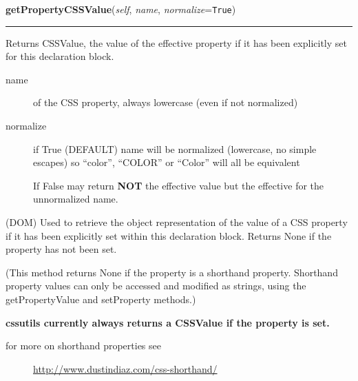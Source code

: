 \hspace{.8\funcindent}\begin{boxedminipage}{\funcwidth}

    \raggedright \textbf{getPropertyCSSValue}(\textit{self}, \textit{name}, \textit{normalize}={\tt True})

    \vspace{-1.5ex}

    \rule{\textwidth}{0.5\fboxrule}
\setlength{\parskip}{2ex}

Returns CSSValue, the value of the effective property if it has been
explicitly set for this declaration block.
\begin{description}
\item[{name}] \leavevmode 
of the CSS property, always lowercase (even if not normalized)

\item[{normalize}] \leavevmode 
if True (DEFAULT) name will be normalized (lowercase, no simple
escapes) so ``color'', ``COLOR'' or ``Color'' will all be equivalent

If False may return \textbf{NOT} the effective value but the effective
for the unnormalized name.

\end{description}

(DOM)
Used to retrieve the object representation of the value of a CSS
property if it has been explicitly set within this declaration
block. Returns None if the property has not been set.

(This method returns None if the property is a shorthand
property. Shorthand property values can only be accessed and
modified as strings, using the getPropertyValue and setProperty
methods.)

\textbf{cssutils currently always returns a CSSValue if the property is
set.}
\begin{description}
\item[{for more on shorthand properties see}] \leavevmode 
\href{http://www.dustindiaz.com/css-shorthand/}{http://www.dustindiaz.com/css-shorthand/}

\end{description}
\setlength{\parskip}{1ex}
    \end{boxedminipage}

    \label{cssutils:css:cssstyledeclaration:CSSStyleDeclaration:getPropertyValue}

